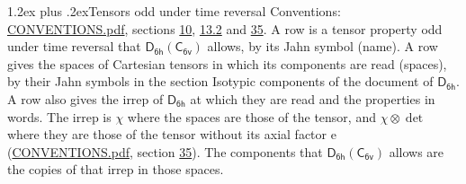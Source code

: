 \documentclass[10pt,a4paper]{article}
\makeatletter
\renewcommand\section{\@startsection{section}{1}{\z@}{-3ex plus -1ex minus -.2ex}%
  {1.2ex plus .2ex}{\normalfont\large\sffamily\bfseries\color{parttitle}}}
\numberwithin{equation}{section}
\newcommand{\grp}[1]{\mathsf{#1}}
\newcommand{\irrprod}{\otimes}
\makeatother
\begin{document}
\section{Tensors odd under time reversal}\label{s:time_odd}
Conventions: \href{../../CONVENTIONS.pdf}{CONVENTIONS.pdf}, sections \href{../../../rotation/CONVENTIONS.pdf\#conv.10}{10}, \href{../../../rotation/CONVENTIONS.pdf\#conv.13.2}{13.2} and \href{../../CONVENTIONS.pdf\#conv.35}{35}.
\leavevmode\label{n:head.name.property}A row is a tensor property odd under time reversal that $\grp{D_{6h}}(\grp{C_{6v}})$ allows, by its Jahn symbol (name). \label{n:head.spaces}A row gives the spaces of Cartesian tensors in which its components are read (spaces), by their Jahn symbols in the section Isotypic components of the document of \href{../../../rotation/data/pdf/D6h.pdf}{$\grp{D_{6h}}$}. \label{n:head.properties}A row also gives the irrep of $\grp{D_{6h}}$ at which they are read and the properties in words. The irrep is $\chi$ where the spaces are those of the tensor, and $\chi \irrprod \det$ where they are those of the tensor without its axial factor e (\href{../../CONVENTIONS.pdf}{CONVENTIONS.pdf}, section \href{../../CONVENTIONS.pdf\#conv.35}{35}). The components that $\grp{D_{6h}}(\grp{C_{6v}})$ allows are the copies of that irrep in those spaces.
\end{document}
